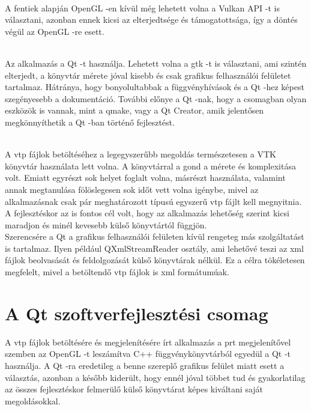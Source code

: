 \begin{description}[font=\normalfont\itshape\space]
\setlength{\parindent}{2ex}
\item [Megjelenítés] \hfill \\
A fentiek alapján OpenGL -en kívül még lehetett volna a Vulkan API -t is választani, 
azonban ennek kicsi az elterjedtsége és támogatottsága, 
így a döntés végül az OpenGL -re esett.
\item [kezelőfelület] \hfill \\
Az alkalmazás a Qt -t használja. Lehetett volna a gtk -t is választani, 
ami szintén elterjedt, a könyvtár mérete jóval kisebb 
és csak grafikus felhasználói felületet tartalmaz. 
Hátránya, hogy bonyolultabbak a függvényhívások és 
a Qt -hez képest szegényesebb a dokumentáció. 
További előnye a Qt -nak, hogy a csomagban olyan eszközök is vannak, 
mint a qmake, vagy a Qt Creator, 
amik jelentősen megkönnyíthetik a Qt -ban történő fejlesztést.
\item [fájlok betöltése] \hfill \\
A vtp fájlok betöltéséhez a legegyszerűbb megoldás természetesen 
a VTK könyvtár használata lett volna. 
A könyvtárral a gond a mérete és komplexitása volt. 
Emiatt egyrészt sok helyet foglalt volna, másrészt használata, 
valamint annak megtanulása fölöslegesen sok időt vett volna igénybe, 
mivel az alkalmazásnak csak pár meghatározott típusú 
egyszerű vtp fájlt kell megnyitnia. 
A fejlesztéskor az is fontos cél volt, 
hogy az alkalmazás lehetőség szerint kicsi maradjon 
és minél kevesebb külső könyvtártól függjön. \\
Szerencsére a Qt a grafikus felhasználói felületen kívül 
rengeteg más szolgáltatást is tartalmaz. 
Ilyen például QXmlStreamReader osztály, 
ami lehetővé teszi az xml fájlok beolvasását 
és feldolgozását külső könyvtárak nélkül. 
Ez a célra tökéletesen megfelelt, 
mivel a betöltendő vtp fájlok is xml formátumúak.
\end{description}

\section{A Qt szoftverfejlesztési csomag}

A vtp fájlok betöltésére és megjelenítésére írt alkalmazás 
a prt megjelenítővel szemben az OpenGL -t leszámítva C++ függvénykönyvtárból 
egyedül a Qt -t használja. 
A Qt -ra eredetileg a benne szereplő grafikus felület miatt esett a választás, 
azonban a később kiderült, 
hogy ennél jóval többet tud 
és gyakorlatilag az összes fejlesztéskor felmerülő külső könyvtárat 
képes kiváltani saját megoldásokkal.

